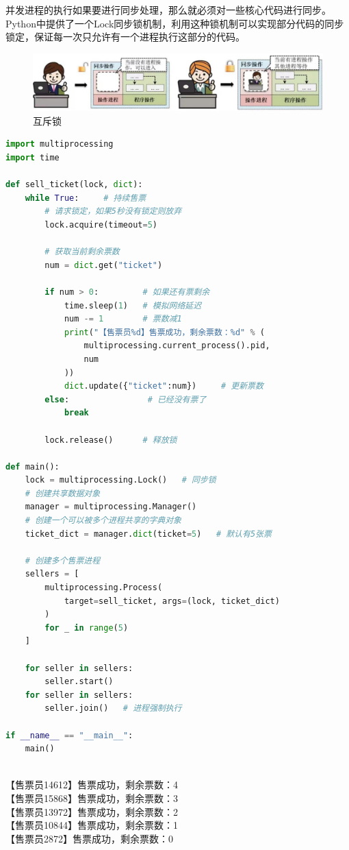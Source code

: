 并发进程的执行如果要进行同步处理，那么就必须对一些核心代码进行同步。Python中提供了一个Lock同步锁机制，利用这种锁机制可以实现部分代码的同步锁定，保证每一次只允许有一个进程执行这部分的代码。

\begin{figure}[H]
	\centering
	\includegraphics[]{img/C2/2-6/1.png}
	\caption{互斥锁}
\end{figure}

\begin{lstlisting}[language=Python, title=售票操作（正确版本）]
import multiprocessing
import time

def sell_ticket(lock, dict):
	while True:     # 持续售票
		# 请求锁定，如果5秒没有锁定则放弃
		lock.acquire(timeout=5)
		
		# 获取当前剩余票数
		num = dict.get("ticket")
		
		if num > 0:         # 如果还有票剩余
			time.sleep(1)   # 模拟网络延迟
			num -= 1        # 票数减1
			print("【售票员%d】售票成功，剩余票数：%d" % (
				multiprocessing.current_process().pid,
				num
			))
			dict.update({"ticket":num})     # 更新票数
		else:                # 已经没有票了
			break
		
		lock.release()      # 释放锁

def main():
	lock = multiprocessing.Lock()   # 同步锁
	# 创建共享数据对象
	manager = multiprocessing.Manager()
	# 创建一个可以被多个进程共享的字典对象
	ticket_dict = manager.dict(ticket=5)   # 默认有5张票

	# 创建多个售票进程
	sellers = [
		multiprocessing.Process(
			target=sell_ticket, args=(lock, ticket_dict)
		) 
		for _ in range(5)
	]

	for seller in sellers:
		seller.start()
	for seller in sellers:
		seller.join()   # 进程强制执行

if __name__ == "__main__":
	main()
\end{lstlisting}

\begin{tcolorbox}
	 \\
	【售票员14612】售票成功，剩余票数：4 \\
	【售票员15868】售票成功，剩余票数：3 \\
	【售票员13972】售票成功，剩余票数：2 \\
	【售票员10844】售票成功，剩余票数：1 \\
	【售票员2872】售票成功，剩余票数：0
\end{tcolorbox}

